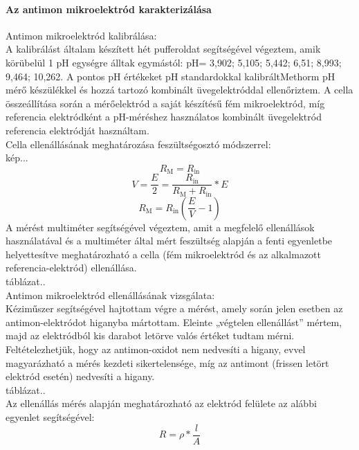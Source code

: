 \paragraph{Az antimon mikroelektród karakterizálása}
Antimon mikroelektród kalibrálása:\\
A kalibrálást általam készített hét pufferoldat segítségével végeztem, amik körübelül 1 pH egységre álltak egymástól: pH= 3,902; 5,105; 5,442; 6,51; 8,993; 9,464; 10,262. A pontos pH értékeket pH standardokkal kalibráltMethorm pH mérő készülékkel és hozzá tartozó kombinált üvegelektróddal ellenőriztem. A cella összeállítása során a mérőelektród a saját készítésű fém mikroelektród, míg referencia elektródként a pH-méréshez használatos kombinált üvegelektród referencia elektródját használtam.\\
Cella ellenállásának meghatározása feszültségosztó módszerrel:\\
kép...\\
\begin{equation}
R_\text{M} = R_\text{in}
\end{equation}
\begin{equation}
V = \frac{E}{2} = \frac{R_\text{in}}{R_\text{M} + R_\text{in}} * E
\end{equation}
\begin{equation}
R_\text{M} = R_\text{in} (\frac{E}{V} -1)
\end{equation}
A mérést multiméter segítségével végeztem, amit a megfelelő ellenállások használatával és a           multiméter által mért feszültség alapján a fenti egyenletbe helyettesítve meghatározható a cella (fém     mikroelektród és az alkalmazott referencia-elektród) ellenállása. \\
táblázat..\\
Antimon mikroelektród ellenállásának vizsgálata:\\
Kéziműszer segítségével hajtottam végre a mérést, amely során jelen esetben az antimon-elektródot higanyba mártottam. Eleinte „végtelen ellenállást” mértem, majd az elektródból kis darabot letörve valós értéket tudtam mérni. Feltételezhetjük, hogy az antimon-oxidot nem nedvesíti a higany, evvel magyarázható a mérés kezdeti sikertelensége, míg az antimont (frissen letört elektród esetén) nedvesíti a higany.\\
táblázat..\\
Az ellenállás mérés alapján meghatározható az elektród felülete az alábbi egyenlet segítségével: \\
\begin{equation}
R = \rho * \frac{l}{A}
\end{equation}

